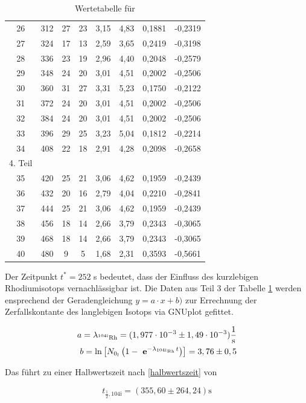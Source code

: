 \begin{table}[H]
\begin{tabular}{c|c|c|c|c|c|c|c}
26&	312&	27&	23&	3,15&	4,83&	0,1881&	-0,2319\\
27&	324&	17&	13&	2,59&	3,65&	0,2419&	-0,3198\\
28&	336&	23&	19&	2,96&	4,40&	0,2048&	-0,2579\\
29&	348&	24&	20&	3,01&	4,51&	0,2002&	-0,2506\\
30&	360&	31&	27&	3,31&	5,23&	0,1750&	-0,2122\\
31&	372&	24&	20&	3,01&	4,51&	0,2002&	-0,2506\\
32&	384&	24&	20&	3,01&	4,51&	0,2002&	-0,2506\\
33&	396&	29&	25&	3,23&	5,04&	0,1812&	-0,2214\\
34&	408&	22&	18&	2,91&	4,28&	0,2098&	-0,2658\\
\hline
4. Teil \\
\hline
35&	420&	25&	21&	3,06&	4,62&	0,1959&	-0,2439\\
36&	432&	20&	16&	2,79&	4,04&	0,2210&	-0,2841\\
37&	444&	25&	21&	3,06&	4,62&	0,1959&	-0,2439\\
38&	456&	18&	14&	2,66&	3,79&	0,2343&	-0,3065\\
39&	468&	18&	14&	2,66&	3,79&	0,2343&	-0,3065\\
40&	480&	9&	5&	1,68&	2,31&	0,3593&	-0,5661\\

\end{tabular}
\caption{Wertetabelle für }
\label{tabrhod}
\end{table}
\renewcommand{\arraystretch}{1}

Der Zeitpunkt $t^* = 252$ s bedeutet, dass der Einfluss des kurzlebigen Rhodiumisotops vernachlässigbar ist. Die Daten aus Teil 3 der 
Tabelle \ref{tabrhod} werden ensprechend der Geradengleichung $y = a\cdot x + b)$ zur Errechnung der Zerfallskontante  des langlebigen Isotops
via GNUplot gefittet. 

\begin{align}
a = \ce{\lambda_{^{104i}Rh}} = (1,977\cdot 10^{-3} \pm 1,49 \cdot 10^{-3}) \frac{1}{\text{s}}\\
b = \ln\left[N_{0_l}\left(1-\e^{-\lambda_{^{104\text{i}}\text{Rh}}\,t}\right)\right] = 3,76 \pm 0,5
\end{align}

Das führt zu einer Halbwertszeit nach \eqref{halbwertszeit} von

\begin{equation}
   t_{\frac12,\text{104i}} = (355,60 \pm 264,24) \text{s}
\label{rh1}
\end{equation}

